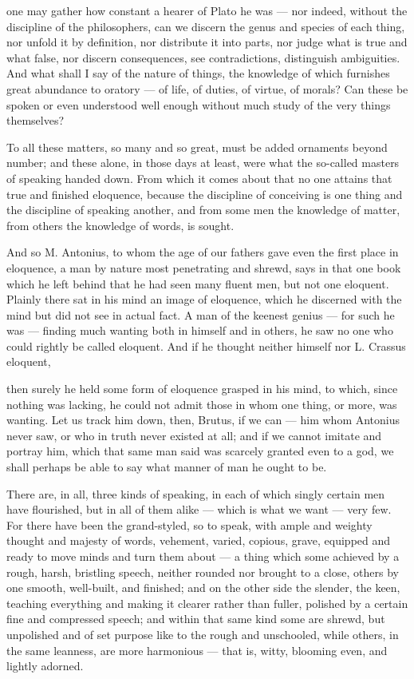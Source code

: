  one may gather how constant a hearer of Plato he was — nor indeed, without the discipline of the philosophers, can we discern the genus and species of each thing, nor unfold it by definition, nor distribute it into parts, nor judge what is true and what false, nor discern consequences, see contradictions, distinguish ambiguities. And what shall I say of the nature of things, the knowledge of which furnishes great abundance to oratory — of life, of duties, of virtue, of morals? Can these be spoken or even understood well enough without much study of the very things themselves?

 To all these matters, so many and so great, must be added ornaments beyond number; and these alone, in those days at least, were what the so-called masters of speaking handed down. From which it comes about that no one attains that true and finished eloquence, because the discipline of conceiving is one thing and the discipline of speaking another, and from some men the knowledge of matter, from others the knowledge of words, is sought.

 And so M. Antonius, to whom the age of our fathers gave even the first place in eloquence, a man by nature most penetrating and shrewd, says in that one book which he left behind that he had seen many fluent men, but not one eloquent. Plainly there sat in his mind an image of eloquence, which he discerned with the mind but did not see in actual fact. A man of the keenest genius — for such he was — finding much wanting both in himself and in others, he saw no one who could rightly be called eloquent. And if he thought neither himself nor L. Crassus eloquent,

 then surely he held some form of eloquence grasped in his mind, to which, since nothing was lacking, he could not admit those in whom one thing, or more, was wanting. Let us track him down, then, Brutus, if we can — him whom Antonius never saw, or who in truth never existed at all; and if we cannot imitate and portray him, which that same man said was scarcely granted even to a god, we shall perhaps be able to say what manner of man he ought to be.

 There are, in all, three kinds of speaking, in each of which singly certain men have flourished, but in all of them alike — which is what we want — very few. For there have been the grand-styled, so to speak, with ample and weighty thought and majesty of words, vehement, varied, copious, grave, equipped and ready to move minds and turn them about — a thing which some achieved by a rough, harsh, bristling speech, neither rounded nor brought to a close, others by one smooth, well-built, and finished; and on the other side the slender, the keen, teaching everything and making it clearer rather than fuller, polished by a certain fine and compressed speech; and within that same kind some are shrewd, but unpolished and of set purpose like to the rough and unschooled, while others, in the same leanness, are more harmonious — that is, witty, blooming even, and lightly adorned.

